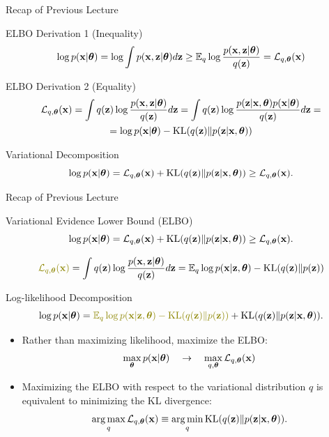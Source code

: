 \documentclass{beamer}
\begin{document}
\begin{frame}{Recap of Previous Lecture}
	\begin{block}{ELBO Derivation 1 (Inequality)}
		\vspace{-0.3cm}
		\begin{multline*}
			\log p(\mathbf{x}| \boldsymbol{\theta}) 
			= \log \int p(\mathbf{x}, \mathbf{z} | \boldsymbol{\theta}) d\mathbf{z} \geq \mathbb{E}_{q} \log \frac{p(\mathbf{x}, \mathbf{z}| \boldsymbol{\theta})}{q(\mathbf{z})} = \mathcal{L}_{q, \boldsymbol{\theta}}(\mathbf{x})
		\end{multline*}
		\vspace{-0.3cm}
	\end{block}
	\begin{block}{ELBO Derivation 2 (Equality)}
		\vspace{-0.3cm}
		\begin{multline*}
			\mathcal{L}_{q, \boldsymbol{\theta}}(\mathbf{x}) = \int q(\mathbf{z}) \log \frac{p(\mathbf{x}, \mathbf{z} | \boldsymbol{\theta})}{q(\mathbf{z})}d\mathbf{z} = 
			\int q(\mathbf{z}) \log \frac{p(\mathbf{z}|\mathbf{x}, \boldsymbol{\theta})p(\mathbf{x}| \boldsymbol{\theta})}{q(\mathbf{z})}d\mathbf{z} = \\
			= \log p(\mathbf{x}| \boldsymbol{\theta}) - \mathrm{KL}(q(\mathbf{z}) \| p(\mathbf{z}|\mathbf{x}, \boldsymbol{\theta}))
		\end{multline*}
	\end{block}
	\vspace{-0.3cm}
	\begin{block}{Variational Decomposition}
		\[
		\log p(\mathbf{x}| \boldsymbol{\theta}) = \mathcal{L}_{q, \boldsymbol{\theta}}(\mathbf{x}) + \mathrm{KL}(q(\mathbf{z}) \| p(\mathbf{z}|\mathbf{x}, \boldsymbol{\theta})) \geq \mathcal{L}_{q, \boldsymbol{\theta}}(\mathbf{x}).
		\]
	\end{block}
\end{frame}
\begin{frame}{Recap of Previous Lecture}
	\begin{block}{Variational Evidence Lower Bound (ELBO)}
		\vspace{-0.3cm}
		\[
			\log p(\mathbf{x}| \boldsymbol{\theta}) = \mathcal{L}_{q, \boldsymbol{\theta}}(\mathbf{x}) + \mathrm{KL}(q(\mathbf{z}) \| p(\mathbf{z}|\mathbf{x}, \boldsymbol{\theta})) \geq \mathcal{L}_{q, \boldsymbol{\theta}}(\mathbf{x}).
		\]
	\end{block}

	\vspace{-0.5cm}
	\[
	 	{\color{olive}\cL_{q, \btheta}(\bx)} = \int q(\bz) \log \frac{p(\bx, \bz | \btheta)}{q(\bz)}d\bz = \bbE_{q} \log p(\bx | \bz, \btheta) - \KL (q(\bz) \| p(\bz))
	\]
	\vspace{-0.3cm}
	\begin{block}{Log-likelihood Decomposition}
		\vspace{-0.5cm}
		\[
	 		\log p(\bx| \btheta) = {\color{olive}\bbE_{q} \log p(\bx | \bz, \btheta) - \KL (q(\bz) \| p(\bz))} + \KL(q(\bz) \| p(\bz|\bx, \btheta)).
		\]
	\end{block}
	\begin{itemize}
	\item Rather than maximizing likelihood, maximize the ELBO:
   	\[
		\max_{\boldsymbol{\theta}} p(\mathbf{x} | \boldsymbol{\theta}) \quad \rightarrow \quad \max_{q, \boldsymbol{\theta}} \mathcal{L}_{q, \boldsymbol{\theta}}(\mathbf{x})
   	\]
   	\item Maximizing the ELBO with respect to the variational distribution $q$ is equivalent to minimizing the KL divergence:
  	\[
		\operatorname*{arg\,max}_q \mathcal{L}_{q, \boldsymbol{\theta}}(\mathbf{x}) \equiv \operatorname*{arg\,min}_q \mathrm{KL}(q(\mathbf{z}) \| p(\mathbf{z}|\mathbf{x}, \boldsymbol{\theta})).
  	\]
  	\end{itemize}
\end{frame}
\end{document}
